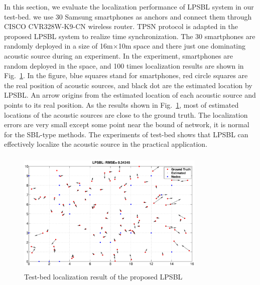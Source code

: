 In this section, we evaluate the localization performance of LPSBL system in our test-bed.
we use 30 Samsung smartphones as anchors and connect them through CISCO CVR328W-K9-CN wireless router. 
TPSN protocol is adapted in the proposed LPSBL system to realize time synchronization.
The 30 smartphones are randomly deployed in a size of 16m$\times$10m space and there just one dominating acoustic source during an experiment.
In the experiment, smartphones are random deployed in the space, and 100 times localization results are shown in Fig.~\ref{emulation}. 
In the figure, blue squares stand for smartphones, red circle squares are the real position of acoustic sources, and black dot are the estimated location by LPSBL. 
An arrow origins from the estimated location of each acoustic source and points to its real position. 
As the results shown in Fig.~\ref{emulation}, most of estimated locations of the acoustic sources are close to the ground truth.
The localization errors are very small except some point near the bound of network, it is normal for the SBL-type methods.
The experiments of test-bed shows that LPSBL can effectively localize the acoustic source in the practical application.
  \begin{figure}[htb]
            \includegraphics[height=6cm,width=9.0cm]{image/emulation.eps}
             \caption{Test-bed localization result of the proposed LPSBL}
             \vspace{-5mm}
             \label{emulation}
        \end{figure}
